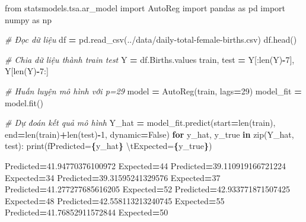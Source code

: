 \documentclass[
]{book}
\newenvironment{Shaded}{\begin{snugshade}}{\end{snugshade}}
\newcommand{\BuiltInTok}[1]{#1}
\newcommand{\CharTok}[1]{\textcolor[rgb]{0.31,0.60,0.02}{#1}}
\newcommand{\CommentTok}[1]{\textcolor[rgb]{0.56,0.35,0.01}{\textit{#1}}}
\newcommand{\ControlFlowTok}[1]{\textcolor[rgb]{0.13,0.29,0.53}{\textbf{#1}}}
\newcommand{\DecValTok}[1]{\textcolor[rgb]{0.00,0.00,0.81}{#1}}
\newcommand{\FloatTok}[1]{\textcolor[rgb]{0.00,0.00,0.81}{#1}}
\newcommand{\ImportTok}[1]{#1}
\newcommand{\KeywordTok}[1]{\textcolor[rgb]{0.13,0.29,0.53}{\textbf{#1}}}
\newcommand{\NormalTok}[1]{#1}
\newcommand{\OperatorTok}[1]{\textcolor[rgb]{0.81,0.36,0.00}{\textbf{#1}}}
\newcommand{\SpecialCharTok}[1]{\textcolor[rgb]{0.81,0.36,0.00}{\textbf{#1}}}
\newcommand{\SpecialStringTok}[1]{\textcolor[rgb]{0.31,0.60,0.02}{#1}}
\newcommand{\StringTok}[1]{\textcolor[rgb]{0.31,0.60,0.02}{#1}}
\newcommand{\VariableTok}[1]{\textcolor[rgb]{0.00,0.00,0.00}{#1}}
\begin{document}
\begin{Shaded}
\begin{Highlighting}[]
\ImportTok{from}\NormalTok{ statsmodels.tsa.ar\_model }\ImportTok{import}\NormalTok{ AutoReg}
\ImportTok{import}\NormalTok{ pandas }\ImportTok{as}\NormalTok{ pd }
\ImportTok{import}\NormalTok{ numpy }\ImportTok{as}\NormalTok{ np}

\CommentTok{\# Đọc dữ liệu}
\NormalTok{df }\OperatorTok{=}\NormalTok{ pd.read\_csv(}\StringTok{\textquotesingle{}../data/daily{-}total{-}female{-}births.csv\textquotesingle{}}\NormalTok{)}
\NormalTok{df.head()}

\CommentTok{\# Chia dữ liệu thành train test}
\NormalTok{Y }\OperatorTok{=}\NormalTok{ df.Births.values}
\NormalTok{train, test }\OperatorTok{=}\NormalTok{ Y[:}\BuiltInTok{len}\NormalTok{(Y)}\OperatorTok{{-}}\DecValTok{7}\NormalTok{], Y[}\BuiltInTok{len}\NormalTok{(Y)}\OperatorTok{{-}}\DecValTok{7}\NormalTok{:]}

\CommentTok{\# Huấn luyện mô hình với p=29}
\NormalTok{model }\OperatorTok{=}\NormalTok{ AutoReg(train, lags}\OperatorTok{=}\DecValTok{29}\NormalTok{)}
\NormalTok{model\_fit }\OperatorTok{=}\NormalTok{ model.fit()}

\CommentTok{\# Dự đoán kết quả mô hình}
\NormalTok{Y\_hat }\OperatorTok{=}\NormalTok{ model\_fit.predict(start}\OperatorTok{=}\BuiltInTok{len}\NormalTok{(train), end}\OperatorTok{=}\BuiltInTok{len}\NormalTok{(train)}\OperatorTok{+}\BuiltInTok{len}\NormalTok{(test)}\OperatorTok{{-}}\DecValTok{1}\NormalTok{, dynamic}\OperatorTok{=}\VariableTok{False}\NormalTok{)}
\ControlFlowTok{for}\NormalTok{ y\_hat, y\_true }\KeywordTok{in} \BuiltInTok{zip}\NormalTok{(Y\_hat, test):}
    \BuiltInTok{print}\NormalTok{(}\SpecialStringTok{f\textquotesingle{}Predicted=}\SpecialCharTok{\{}\NormalTok{y\_hat}\SpecialCharTok{\}}\SpecialStringTok{ }\CharTok{\textbackslash{}t}\SpecialStringTok{Expected=}\SpecialCharTok{\{}\NormalTok{y\_true}\SpecialCharTok{\}}\SpecialStringTok{\textquotesingle{}}\NormalTok{)}
\end{Highlighting}
\end{Shaded}

\begin{Shaded}
\begin{Highlighting}[]
\NormalTok{Predicted}\OperatorTok{=}\FloatTok{41.94770376100972}\NormalTok{     Expected}\OperatorTok{=}\DecValTok{44}
\NormalTok{Predicted}\OperatorTok{=}\FloatTok{39.110919166721224}\NormalTok{    Expected}\OperatorTok{=}\DecValTok{34}
\NormalTok{Predicted}\OperatorTok{=}\FloatTok{39.31595241329576}\NormalTok{     Expected}\OperatorTok{=}\DecValTok{37}
\NormalTok{Predicted}\OperatorTok{=}\FloatTok{41.277277685616205}\NormalTok{    Expected}\OperatorTok{=}\DecValTok{52}
\NormalTok{Predicted}\OperatorTok{=}\FloatTok{42.933771871507425}\NormalTok{    Expected}\OperatorTok{=}\DecValTok{48}
\NormalTok{Predicted}\OperatorTok{=}\FloatTok{42.558113213240745}\NormalTok{    Expected}\OperatorTok{=}\DecValTok{55}
\NormalTok{Predicted}\OperatorTok{=}\FloatTok{41.76852911572844}\NormalTok{     Expected}\OperatorTok{=}\DecValTok{50}
\end{Highlighting}
\end{Shaded}
\end{document}

